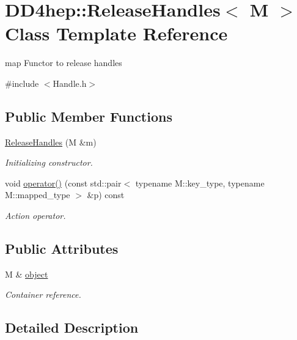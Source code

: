 \hypertarget{class_d_d4hep_1_1_release_handles}{
\section{DD4hep::ReleaseHandles$<$ M $>$ Class Template Reference}
\label{class_d_d4hep_1_1_release_handles}
}


map Functor to release handles  


{\ttfamily \#include $<$Handle.h$>$}\subsection*{Public Member Functions}
\begin{DoxyCompactItemize}
\item 
\hyperlink{class_d_d4hep_1_1_release_handles_ab9f432d35b2e93e934d5346e9d7a3608}{ReleaseHandles} (M \&m)
\begin{DoxyCompactList}\small\item\em Initializing constructor. \item\end{DoxyCompactList}\item 
void \hyperlink{class_d_d4hep_1_1_release_handles_ae19d6f7d216512507c1cc64dcf8f7a38}{operator()} (const std::pair$<$ typename M::key\_\-type, typename M::mapped\_\-type $>$ \&p) const 
\begin{DoxyCompactList}\small\item\em Action operator. \item\end{DoxyCompactList}\end{DoxyCompactItemize}
\subsection*{Public Attributes}
\begin{DoxyCompactItemize}
\item 
M \& \hyperlink{class_d_d4hep_1_1_release_handles_a859c2b05fd3a51dbbeee2b6937a19068}{object}
\begin{DoxyCompactList}\small\item\em Container reference. \item\end{DoxyCompactList}\end{DoxyCompactItemize}


\subsection{Detailed Description}
